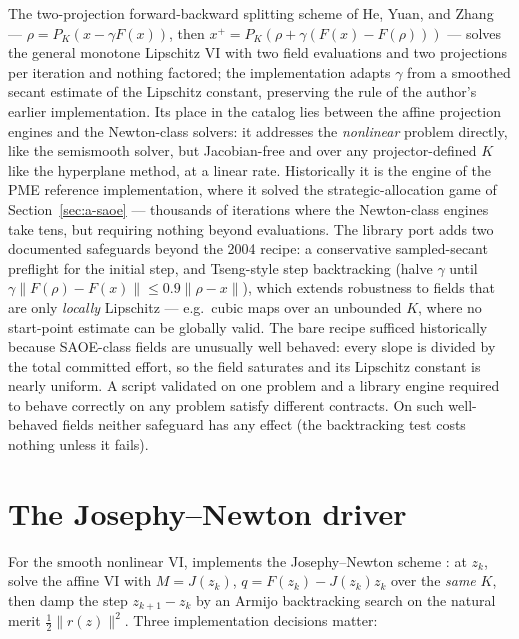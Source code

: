 The two-projection forward-backward splitting scheme of He, Yuan, and
Zhang \cite{hyz2004} --- $\rho = P_K(x - \gamma F(x))$, then
$x^{+} = P_K(\rho + \gamma(F(x) - F(\rho)))$ --- solves the general
monotone Lipschitz VI with two field evaluations and two projections per
iteration and nothing factored; the implementation adapts $\gamma$ from a
smoothed secant estimate of the Lipschitz constant, preserving the rule of
the author's earlier  implementation. Its place in the
catalog lies between the affine projection engines and the Newton-class
solvers: it addresses the \emph{nonlinear} problem directly, like the
semismooth solver, but Jacobian-free and over any projector-defined $K$
like the hyperplane method, at a linear rate. Historically it is the
engine of the PME reference implementation, where it solved the
strategic-allocation game of Section~\ref{sec:a-saoe} --- thousands of
iterations where the Newton-class engines take tens, but requiring nothing
beyond evaluations. The library port adds two documented safeguards beyond
the 2004 recipe: a conservative sampled-secant preflight for the initial
step, and Tseng-style step backtracking (halve $\gamma$ until
$\gamma\|F(\rho) - F(x)\| \le 0.9\|\rho - x\|$), which extends robustness
to fields that are only \emph{locally} Lipschitz --- e.g.\ cubic maps over
an unbounded $K$, where no start-point estimate can be globally valid. The
bare recipe sufficed historically because SAOE-class fields are unusually
well behaved: every slope is divided by the total committed effort, so the
field saturates and its Lipschitz constant is nearly uniform. A script
validated on one problem and a library engine required to behave correctly
on any problem satisfy different contracts. On such well-behaved fields
neither safeguard has any effect (the backtracking test costs nothing
unless it fails).

\section{The Josephy--Newton driver}
\label{sec:a-jn}

For the smooth nonlinear VI,  implements the Josephy--Newton
scheme \cite{josephy1979}: at $z_k$, solve the affine VI with
$M = J(z_k)$, $q = F(z_k) - J(z_k) z_k$ over the \emph{same} $K$, then damp
the step $z_{k+1} - z_k$ by an Armijo backtracking search on the natural
merit $\tfrac12\|r(z)\|^2$. Three implementation decisions matter:

